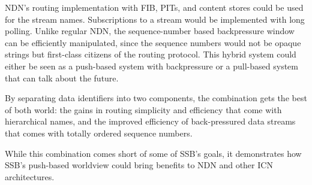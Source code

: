 \documentclass[9pt,sigconf]{acmart}
\begin{document}
NDN's routing implementation with FIB, PITs, and content stores could be used for the stream names. Subscriptions to a stream would be implemented with long polling. Unlike regular NDN, the sequence-number based backpressure window can be efficiently manipulated, since the sequence numbers would not be opaque strings but first-class citizens of the routing protocol. This hybrid system could either be seen as a push-based system with backpressure or a pull-based system that can talk about the future.

By separating data identifiers into two components, the combination gets the best of both world: the gains in routing simplicity and efficiency that come with hierarchical names, and the improved efficiency of back-pressured data streams that comes with totally ordered sequence numbers.

While this combination comes short of some of SSB's goals, it demonstrates how SSB's push-based worldview could bring benefits to NDN and other ICN architectures.

%
%
\end{document}
